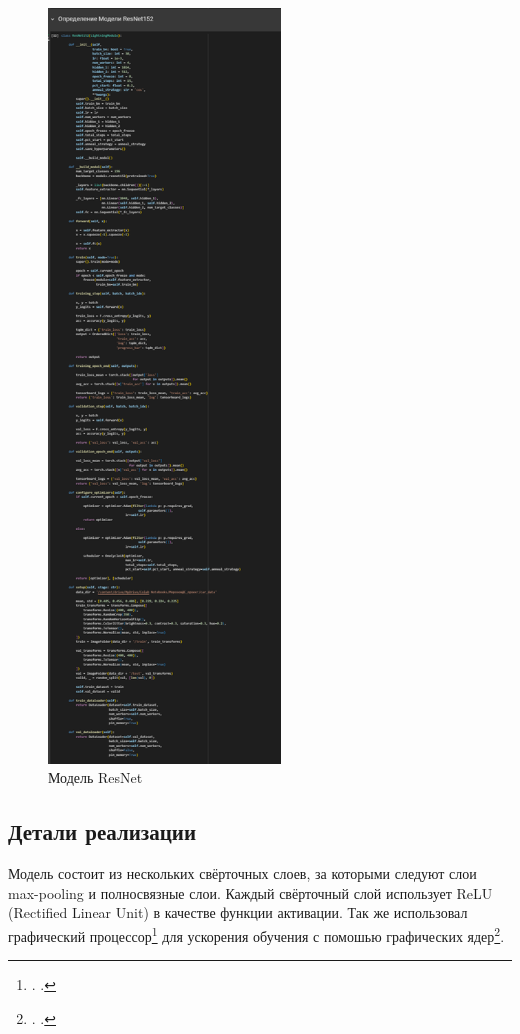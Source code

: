 \documentclass[14pt]{extarticle}
\begin{document}
\begin{figure}[H]
\hfill
\begin{minipage}{0.49\textwidth}
  \centering
  \includegraphics[height=20cm]{images/7.png}  
  \caption{Модель ResNet}
  \label{fig:13}
\end{minipage}
\end{figure}

\subsection{Детали реализации}
\hspace{1cm}Модель состоит из нескольких свёрточных слоев, за которыми следуют слои max-pooling и полносвязные слои. Каждый свёрточный слой использует ReLU (Rectified Linear Unit) в качестве функции активации.
Так же использовал графический процессор\footnote{\citeauthor{youtubegpu}. \emph{}.} для ускорения обучения с помошью графических ядер\footnote{\citeauthor{pytorchgpu}. \emph{}.}.
\end{document}
